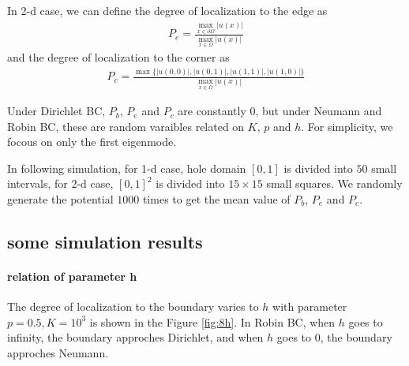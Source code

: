 \documentclass[12pt,a4paper]{article}
\begin{document}
In 2-d case, we can define the degree of localization to the edge as
\begin{align}
P_e = \frac{\max_{x \in \partial\Omega} |u(x)|}{\max_{x \in \Omega} |u(x)|}
\end{align}
and the degree of localization to the corner as
\begin{align}
P_c = \frac{\max\{|u(0,0)|, |u(0,1)|, |u(1,1)|, |u(1,0)|\}}{\max_{x \in \Omega} |u(x)|}
\end{align}

Under Dirichlet BC, $P_b$, $P_e$ and $P_c$ are constantly $0$, but under Neumann and Robin BC, these are random varaibles related on $K$, $p$ and $h$. For simplicity, we focous on only the first eigenmode.

In following simulation, for 1-d case, hole domain $[0,1]$ is divided into $50$ small intervals, for 2-d case, $[0,1]^2$ is divided into $15 \times 15$ small squares. We randomly generate the potential $1000$ times to get the mean value of $P_b$, $P_e$ and $P_c$.

\subsection{some simulation results}

\paragraph{relation of parameter h}

The degree of localization to the boundary varies to $h$ with parameter $p=0.5, K=10^3$ is shown in the Figure \ref{fig:8h}. In Robin BC, when $h$ goes to infinity, the boundary approches Dirichlet, and when $h$ goes to $0$, the boundary approches Neumann.
\end{document}
